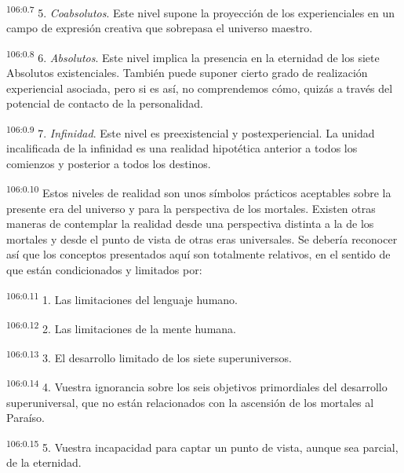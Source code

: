 \documentclass[twoside, 11pt]{book}
\begin{document}
\par
\textsuperscript{106:0.7} 5. \textit{Coabsolutos}. Este nivel supone la proyección de los experienciales en un campo de expresión creativa que sobrepasa el universo maestro.

\par
\textsuperscript{106:0.8} 6. \textit{Absolutos}. Este nivel implica la presencia en la eternidad de los siete Absolutos existenciales. También puede suponer cierto grado de realización experiencial asociada, pero si es así, no comprendemos cómo, quizás a través del potencial de contacto de la personalidad.

\par
\textsuperscript{106:0.9} 7. \textit{Infinidad}. Este nivel es preexistencial y postexperiencial. La unidad incalificada de la infinidad es una realidad hipotética anterior a todos los comienzos y posterior a todos los destinos.

\par
\textsuperscript{106:0.10} Estos niveles de realidad son unos símbolos prácticos aceptables sobre la presente era del universo y para la perspectiva de los mortales. Existen otras maneras de contemplar la realidad desde una perspectiva distinta a la de los mortales y desde el punto de vista de otras eras universales. Se debería reconocer así que los conceptos presentados aquí son totalmente relativos, en el sentido de que están condicionados y limitados por:

\par
\textsuperscript{106:0.11} 1. Las limitaciones del lenguaje humano.

\par
\textsuperscript{106:0.12} 2. Las limitaciones de la mente humana.

\par
\textsuperscript{106:0.13} 3. El desarrollo limitado de los siete superuniversos.

\par
\textsuperscript{106:0.14} 4. Vuestra ignorancia sobre los seis objetivos primordiales del desarrollo superuniversal, que no están relacionados con la ascensión de los mortales al Paraíso.

\par
\textsuperscript{106:0.15} 5. Vuestra incapacidad para captar un punto de vista, aunque sea parcial, de la eternidad.
\end{document}
